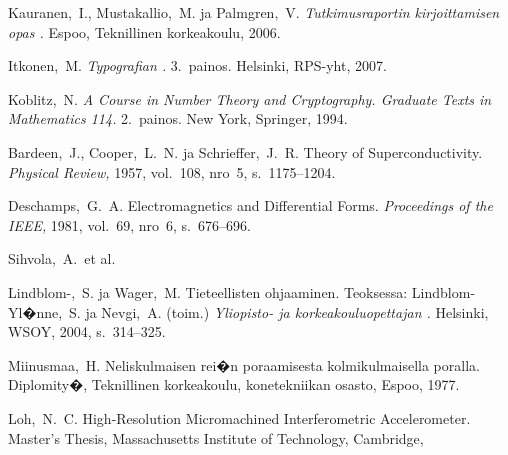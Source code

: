 
 Kauranen,\ I., Mustakallio,\ M. ja Palmgren,\ V.
  \textit{Tutkimusraportin kirjoittamisen opas 
    .}  Espoo, Teknillinen korkeakoulu, 2006.

 Itkonen,\ M. \textit{Typografian .} 3.\
  painos.  Helsinki, RPS-yht, 2007.

 Koblitz,\ N. \textit{A Course in Number Theory and
    Cryptography. Graduate Texts in Mathematics 114.}  2.\ painos. New
  York, Springer, 1994.

\bibitem{bcs} Bardeen,\ J., Cooper,\ L.\ N. ja Schrieffer,\ J.\ R.
  Theory of Superconductivity. \textit{Physical Review,} 1957, vol.\
  108, nro~5, s.\ 1175--1204.

 Deschamps,\ G.\ A. Electromagnetics and
  Differential Forms. \textit{Proceedings of the IEEE,} 1981, vol.\
  69, nro~6, s.\ 676--696.

\bibitem{Sihvola} Sihvola,\ A.\ et al.
  

 Lindblom-,\ S. ja Wager,\ M.  Tieteellisten
   ohjaaminen. Teoksessa: Lindblom-Yl�nne,\ S. ja
  Nevgi,\ A. (toim.) \textit{Yliopisto- ja korkeakouluopettajan
    .}  Helsinki, WSOY, 2004, s.\ 314--325.
 
\bibitem{Miinusmaa} Miinusmaa,\ H. Neliskulmaisen rei�n poraamisesta
  kolmikulmaisella poralla. Diplomity�, Teknillinen korkeakoulu,
  konetekniikan osasto, Espoo, 1977.

\bibitem{Loh} Loh,\ N.\ C. High-Resolution Micromachined
  Interferometric Accelerometer. Master's Thesis, Massachusetts
  Institute of Technology, Cambridge,

